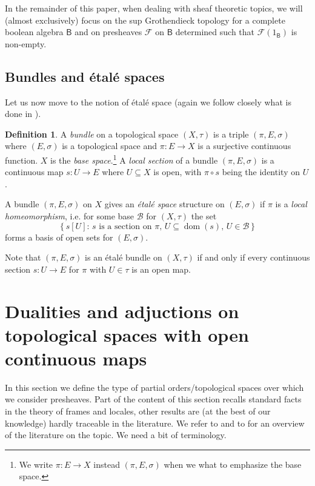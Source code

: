 \documentclass[11pt]{amsart}
\newcommand{\F}{\mathcal{F}}
\theoremstyle{plain}
\theoremstyle{definition}
\newtheorem{definition}[theorem]{Definition}
\theoremstyle{plain}
\theoremstyle{remark}
\newcommand{\M}{\mathcal{M}}
\DeclareMathOperator{\dom}{dom}
\newcommand{\bool}[1]{\mathsf{#1}}
\newcommand{\bp}[1]{\left\lbrace #1 \right\rbrace}
\newcommand{\0}{\mathsf{0}}
\renewcommand{\1}{\mathsf{1}}
\renewcommand{\2}{\mathsf{2}}
\theoremstyle{definition}
\begin{document}
In the remainder of this paper, when dealing with sheaf theoretic topics, we will (almost exclusively)  focus on the sup Grothendieck topology for a complete boolean algebra $\bool{B}$ and on presheaves $\F$ on $\bool{B}$ determined such that $\F(1_\bool{B})$ is non-empty.

\subsection{Bundles and \'etal\'e spaces}
Let us now move to the notion of \'etal\'e space (again we follow closely what is done in \cite[Chapter II]{MacLMoer}).%
\begin{definition}
A \emph{bundle} on a topological space $(X,\tau)$ is a triple $(\pi, E, \sigma)$ where $(E, \sigma)$ is a topological space and $\pi:E\to X$ is a surjective continuous function. $X$ is the \emph{base space}.\footnote{We write $\pi:E\to X$ instead $(\pi, E, \sigma)$ when we what to emphasize the base space.}
A \emph{local section} of a bundle $(\pi, E, \sigma)$ is a continuous map $s:U\to E$ where $U\subseteq X$ is open, with $\pi\circ s$ being the identity on $U$.


 A bundle $(\pi, E, \sigma)$ on $X$ gives an \emph{\'etal\'e space} structure on $(E,\sigma)$ if $\pi$ is a \emph{local homeomorphism}, i.e. for some base $\mathcal{B}$ for $(X,\tau)$ the set
 \[
 \bp{s[U]:\,s\text{ is a section on $\pi$, }U\subseteq\dom(s),\, U\in\mathcal{B}}
 \]
 forms a basis of open sets for $(E,\sigma)$.
\end{definition}

Note that $(\pi,E,\sigma)$ is an \'etal\'e bundle on $(X,\tau)$ if and only if every continuous section $s:U\to E$ for $\pi$ with $U\in\tau$ is an open map.

\section{Dualities and adjuctions on topological spaces with open continuous maps}
\label{sec:dual}

In this section we define the type of partial orders/topological spaces over which we consider presheaves. Part of the content of this section recalls standard facts in the theory of frames and locales, other results are (at the best of our knowledge) hardly traceable in the literature. We refer to \cite[Chapter IX]{MacLMoer} and to \cite[Chapter C1]{JohnElephant} for an overview of the literature on the topic.
We need a bit of terminology.
\end{document}
